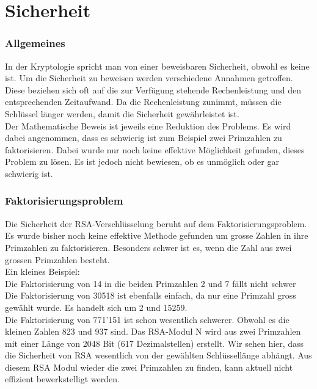 \part{Sicherheit}
\section{Allgemeines}
In der Kryptologie spricht man von einer beweisbaren Sicherheit, obwohl es keine ist. Um die Sicherheit zu beweisen werden verschiedene Annahmen getroffen. Diese beziehen sich oft auf die zur Verfügung stehende Rechenleistung und den entsprechenden Zeitaufwand. Da die Rechenleistung zunimmt, müssen die Schlüssel länger werden, damit die Sicherheit gewährleistet ist. \\
Der Mathematische Beweis ist jeweils eine Reduktion des Problems. Es wird dabei angenommen, dass es schwierig ist zum Beispiel zwei Primzahlen zu faktorisieren. Dabei wurde nur noch keine effektive Möglichkeit gefunden, dieses Problem zu lösen. Es ist jedoch nicht bewiesen, ob es unmöglich oder gar schwierig ist.

\section{Faktorisierungsproblem}
Die Sicherheit der RSA-Verschlüsselung beruht auf dem Faktorisierungsproblem. Es wurde bisher noch keine effektive Methode gefunden um grosse Zahlen in ihre Primzahlen zu faktorisieren. Besonders schwer ist es, wenn die Zahl aus zwei grossen Primzahlen besteht. \\
Ein kleines Beispiel:\\
Die Faktorisierung von 14 in die beiden Primzahlen 2 und 7 fällt nicht schwer\\
Die Faktorisierung von 30518 ist ebenfalls einfach, da nur eine Primzahl gross gewählt wurde. Es handelt sich um 2 und 15259. \\
Die Faktorisierung von 771'151 ist schon wesentlich schwerer. Obwohl es die kleinen Zahlen 823 und 937 sind. Das RSA-Modul N wird aus zwei Primzahlen mit einer Länge von 2048 Bit (617 Dezimalstellen) erstellt. Wir sehen hier, dass die Sicherheit von RSA wesentlich von der gewählten Schlüssellänge abhängt. Aus diesem RSA Modul wieder die zwei Primzahlen zu finden, kann aktuell nicht effizient bewerkstelligt werden.
%
